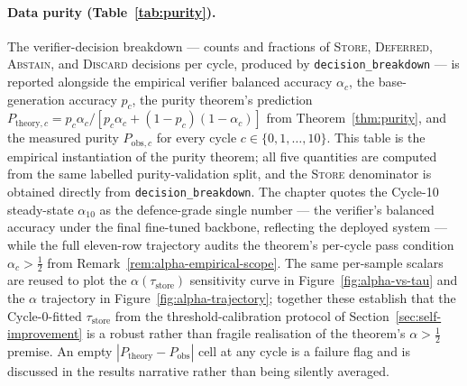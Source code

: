 \paragraph{Data purity (Table~\ref{tab:purity}).}
The verifier-decision breakdown --- counts and fractions of \textsc{Store}, \textsc{Deferred}, \textsc{Abstain}, and \textsc{Discard} decisions per cycle, produced by \texttt{decision\_breakdown} --- is reported alongside the empirical verifier balanced accuracy $\alpha_{c}$, the base-generation accuracy $p_{c}$, the purity theorem's prediction $P_{\text{theory}, c} = p_{c}\alpha_{c} / [p_{c}\alpha_{c} + (1 - p_{c})(1 - \alpha_{c})]$ from Theorem~\ref{thm:purity}, and the measured purity $P_{\text{obs}, c}$ for every cycle $c \in \{0, 1, \ldots, 10\}$. This table is the empirical instantiation of the purity theorem; all five quantities are computed from the same labelled purity-validation split, and the \textsc{Store} denominator is obtained directly from \texttt{decision\_breakdown}. The chapter quotes the Cycle-10 steady-state $\alpha_{10}$ as the defence-grade single number --- the verifier's balanced accuracy under the final fine-tuned backbone, reflecting the deployed system --- while the full eleven-row trajectory audits the theorem's per-cycle pass condition $\alpha_{c} > \tfrac{1}{2}$ from Remark~\ref{rem:alpha-empirical-scope}. The same per-sample scalars are reused to plot the $\alpha(\tau_{\text{store}})$ sensitivity curve in Figure~\ref{fig:alpha-vs-tau} and the $\alpha$ trajectory in Figure~\ref{fig:alpha-trajectory}; together these establish that the Cycle-0-fitted $\tau_{\text{store}}$ from the threshold-calibration protocol of Section~\ref{sec:self-improvement} is a robust rather than fragile realisation of the theorem's $\alpha > \tfrac{1}{2}$ premise. An empty $|P_{\text{theory}} - P_{\text{obs}}|$ cell at any cycle is a failure flag and is discussed in the results narrative rather than being silently averaged.


